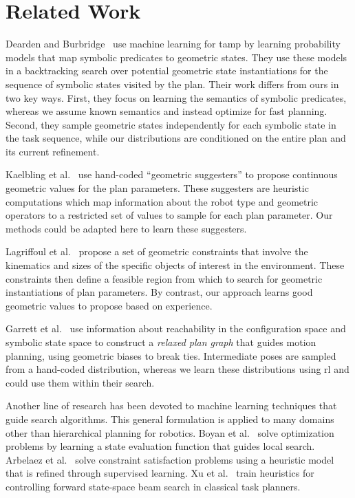 \section{Related Work}
Dearden and Burbridge~\cite{deardenplanningtamp} use machine learning for {\sc tamp} by learning probability
models that map symbolic predicates to geometric states. They use these models in a backtracking search
over potential geometric state instantiations for the sequence of symbolic states visited by the plan.
Their work differs from ours in two key ways. First, they focus on learning the semantics of symbolic predicates, whereas
we assume known semantics and instead optimize for fast planning. Second, they sample geometric states independently
for each symbolic state in the task sequence, while our distributions are conditioned on the
entire plan and its current refinement.

Kaelbling et al.~\cite{kaelbling2011hierarchical} use hand-coded ``geometric suggesters'' to propose
continuous geometric values for the plan parameters. These suggesters are heuristic
computations which map information about the robot type and geometric operators to a restricted
set of values to sample for each plan parameter. Our methods could be adapted here to learn these
suggesters.

Lagriffoul et al.~\cite{lagriffoul2014orientation}
propose a set of geometric constraints that involve the kinematics and sizes of the specific objects of
interest in the environment. These constraints then define a feasible region from which to search
for geometric instantiations of plan parameters. By contrast, our approach learns good geometric values
to propose based on experience.

Garrett et al.~\cite{GarrettWAFR14} use information about reachability in the configuration
space and symbolic state space to construct a \emph{relaxed plan graph} that guides motion
planning, using geometric biases to break ties. Intermediate poses are sampled from a hand-coded
distribution, whereas we learn these distributions using {\sc rl} and could use them within their search.

Another line of research has been devoted to machine learning techniques that
guide search algorithms. This general formulation
is applied to many domains other than hierarchical planning for robotics.
Boyan et al.~\cite{Boyanlearning} solve optimization problems by learning a state
evaluation function that guides local search. Arbelaez et al.~\cite{hamadisearch} solve constraint
satisfaction problems using a heuristic model that is refined through supervised learning.
Xu et al.~\cite{Xu07discriminativelearning} train heuristics for controlling forward
state-space beam search in classical task planners.

